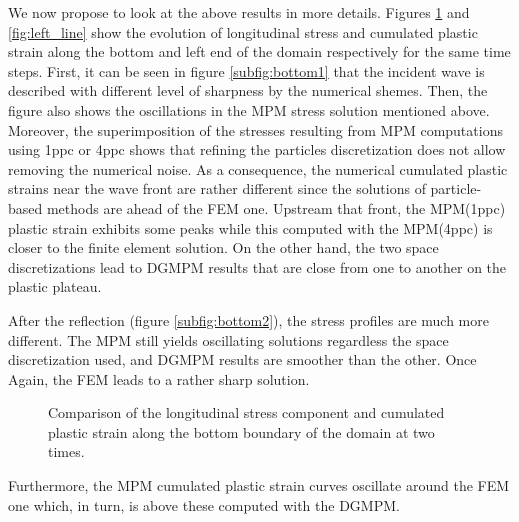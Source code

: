 We now propose to look at the above results in more details.
Figures \ref{fig:bottom_line} and \ref{fig:left_line} show the evolution of longitudinal stress and cumulated plastic strain along the bottom and left end of the domain respectively for the same time steps.
First, it can be seen in figure \ref{subfig:bottom1} that the incident wave is described with different level of sharpness by the numerical shemes.
Then, the figure also shows the oscillations in the MPM stress solution mentioned above.
Moreover, the superimposition of the stresses resulting from MPM computations using 1ppc or 4ppc shows that refining the particles discretization does not allow removing the numerical noise.
As a consequence, the numerical cumulated plastic strains near the wave front are rather different since the solutions of particle-based methods are ahead of the FEM one.
Upstream that front, the MPM(1ppc) plastic strain exhibits some peaks while this computed with the MPM(4ppc) is closer to the finite element solution.
On the other hand, the two space discretizations lead to DGMPM results that are close from one to another on the plastic plateau.

After the reflection (figure \ref{subfig:bottom2}), the stress profiles are much more different.
The MPM still yields oscillating solutions regardless the space discretization used, and DGMPM results are smoother than the other.
Once Again, the FEM leads to a rather sharp solution.
\begin{figure}[ht]
  \centering
  {}
  {}
  
  \caption{Comparison of the longitudinal stress component and cumulated plastic strain along the bottom boundary of the domain at two times.}
  \label{fig:bottom_line}
\end{figure}
Furthermore, the MPM cumulated plastic strain curves oscillate around the FEM one which, in turn, is above these computed with the DGMPM.

